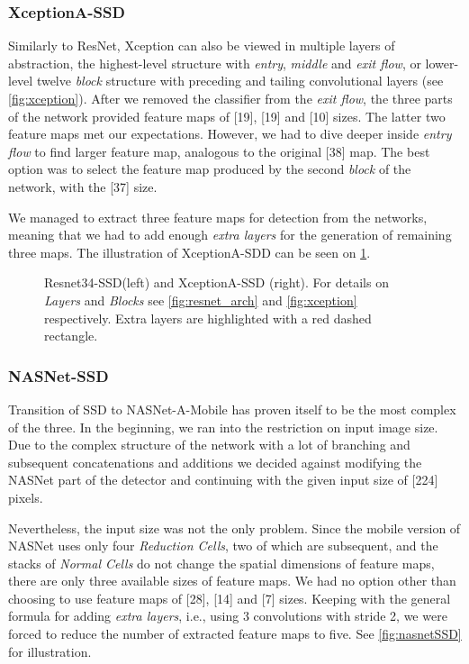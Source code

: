 \subsubsection{XceptionA-SSD} Similarly to ResNet, Xception can also be viewed in multiple layers of abstraction, the highest-level structure with \textit{entry}, \textit{middle} and \textit{exit flow}, or lower-level twelve \textit{block} structure with preceding and tailing convolutional layers (see \cref{fig:xception}). After we removed the classifier from the \textit{exit flow}, the three parts of the network provided feature maps of [19], [19] and [10] sizes. The latter two feature maps met our expectations. However, we had to dive deeper inside \textit{entry flow} to find larger feature map, analogous to the original [38] map. The best option was to select the feature map produced by the second \textit{block} of the network, with the [37] size. 

We managed to extract three feature maps for detection from the networks, meaning that we had to add enough \textit{extra layers} for the generation of remaining three maps. The illustration of XceptionA-SDD can be seen on \cref{fig:resnet_xception_SSD}.


\begin{figure}
    \centering
    \resnetSSD
    \caption[Resnet34-SSD and XceptionA-SSD]%
    {Resnet34-SSD(left) and XceptionA-SSD (right). For details on \textit{Layers} and \textit{Blocks} see \cref{fig:resnet_arch} and \cref{fig:xception} respectively. Extra layers are highlighted with a red dashed rectangle.}

    \label{fig:resnet_xception_SSD}
\end{figure}

\subsubsection{NASNet-SSD} Transition of SSD to NASNet-A-Mobile has proven itself to be the most complex of the three. In the beginning, we ran into the restriction on input image size. Due to the complex structure of the network with a lot of branching and subsequent concatenations and additions we decided against modifying the NASNet part of the detector and continuing with the given input size of [224] pixels.

Nevertheless, the input size was not the only problem. Since the mobile version of NASNet uses only four \textit{Reduction Cells}, two of which are subsequent, and the stacks of \textit{Normal Cells} do not change the spatial dimensions of feature maps, there are only three available sizes of feature maps. We had no option other than choosing to use feature maps of [28], [14] and [7] sizes. Keeping with the general formula for adding \textit{extra layers}, i.e., using 3 convolutions with stride 2, we were forced to reduce the number of extracted feature maps to five. See \cref{fig:nasnetSSD} for illustration.

